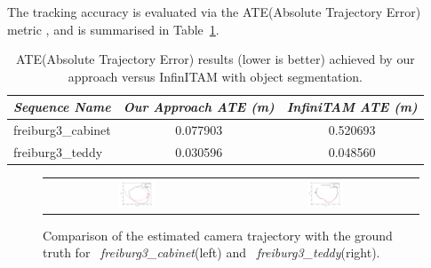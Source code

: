 
The tracking accuracy is evaluated via the ATE(Absolute Trajectory Error) metric \cite{sturm12iros}, and is summarised in Table~\ref{ateTable}.

\begin{table}[!t]
	{
        \footnotesize
		\begin{center}
			\begin{tabular}{l@{\hskip 1cm} c c}
				\emph{Sequence Name} & \emph{Our Approach ATE (m)} & \emph{InfiniTAM ATE (m)}\\
				\midrule
				\textsf{freiburg3\_cabinet} & 0.077903 & 0.520693\\
				\textsf{freiburg3\_teddy}   & 0.030596 & 0.048560 
			\end{tabular}
		\end{center}
	}
   \vspace{-4mm}
	\caption{ATE(Absolute Trajectory Error) results (lower is better) achieved by our approach versus InfinITAM with object segmentation.}
	\label{ateTable}
\end{table}

\begin{figure}[!t]
	\centering
	\begin{tabular}{cc}
		\includegraphics[width=0.2\textwidth]{results/comparative_cabinet.png} &
		\includegraphics[width=0.2\textwidth]{results/comparative_teddy_clean.png}
	\end{tabular}
    \vspace{-3mm}
	\caption{
        Comparison of the estimated camera trajectory with the ground truth for
		~\textit{freiburg3\_cabinet}(left)  and ~\textit{freiburg3\_teddy}(right).
	}
\label{fig:tumTrajectories}
\end{figure}

